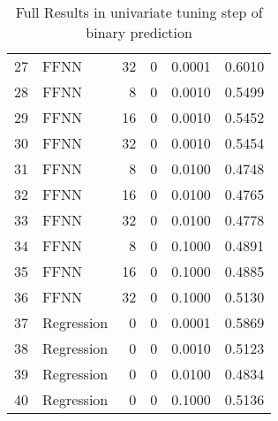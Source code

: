 \begin{table}[ht]
\begin{tabular}{rlrrrr}
  27 & FFNN &    32 &     0 & 0.0001 & 0.6010 \\ 
  28 & FFNN &     8 &     0 & 0.0010 & 0.5499 \\ 
  29 & FFNN &    16 &     0 & 0.0010 & 0.5452 \\ 
  30 & FFNN &    32 &     0 & 0.0010 & 0.5454 \\ 
  31 & FFNN &     8 &     0 & 0.0100 & 0.4748 \\ 
  32 & FFNN &    16 &     0 & 0.0100 & 0.4765 \\ 
  33 & FFNN &    32 &     0 & 0.0100 & 0.4778 \\ 
  34 & FFNN &     8 &     0 & 0.1000 & 0.4891 \\ 
  35 & FFNN &    16 &     0 & 0.1000 & 0.4885 \\ 
  36 & FFNN &    32 &     0 & 0.1000 & 0.5130 \\ 
  37 & Regression &     0 &     0 & 0.0001 & 0.5869 \\ 
  38 & Regression &     0 &     0 & 0.0010 & 0.5123 \\ 
  39 & Regression &     0 &     0 & 0.0100 & 0.4834 \\ 
  40 & Regression &     0 &     0 & 0.1000 & 0.5136 \\ 
   \hline
\end{tabular}
\caption{Full Results in univariate tuning step of binary prediction} 
\label{tab:binary.par.tuning.full}
\end{table}
